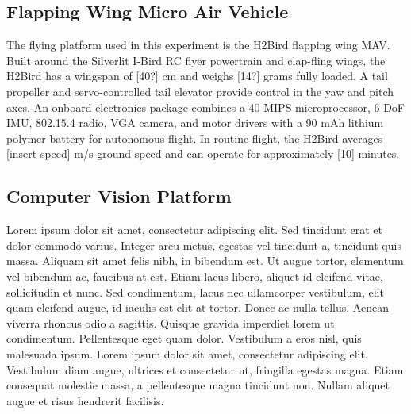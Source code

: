 \documentclass[letterpaper, 10 pt, conference]{ieeeconf}
\begin{document}
\subsection{Flapping Wing Micro Air Vehicle}
The flying platform used in this experiment is the H2Bird flapping wing MAV. Built around the Silverlit I-Bird RC flyer powertrain and clap-fling wings, the H2Bird has a wingspan of [40?] cm and weighs [14?] grams fully loaded. A tail propeller and servo-controlled tail elevator provide control in the yaw and pitch axes. An onboard electronics package combines a 40 MIPS microprocessor, 6 DoF IMU, 802.15.4 radio, VGA camera, and motor drivers with a 90 mAh lithium polymer battery for autonomous flight. In routine flight, the H2Bird averages [insert speed] m/s ground speed and can operate for approximately [10] minutes.

\subsection{Computer Vision Platform}
Lorem ipsum dolor sit amet, consectetur adipiscing elit. Sed tincidunt erat et dolor commodo varius. Integer arcu metus, egestas vel tincidunt a, tincidunt quis massa. Aliquam sit amet felis nibh, in bibendum est. Ut augue tortor, elementum vel bibendum ac, faucibus at est. Etiam lacus libero, aliquet id eleifend vitae, sollicitudin et nunc. Sed condimentum, lacus nec ullamcorper vestibulum, elit quam eleifend augue, id iaculis est elit at tortor. Donec ac nulla tellus. Aenean viverra rhoncus odio a sagittis. Quisque gravida imperdiet lorem ut condimentum. Pellentesque eget quam dolor. Vestibulum a eros nisl, quis malesuada ipsum. Lorem ipsum dolor sit amet, consectetur adipiscing elit. Vestibulum diam augue, ultrices et consectetur ut, fringilla egestas magna. Etiam consequat molestie massa, a pellentesque magna tincidunt non. Nullam aliquet augue et risus hendrerit facilisis.


\end{document}
